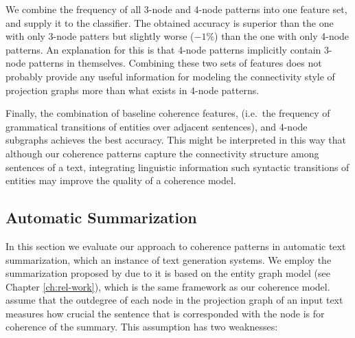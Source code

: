 We combine the frequency of all 3-node and 4-node patterns into one feature set, and supply it to the classifier.   
The obtained accuracy is superior than the one with only 3-node patters but slightly worse  ($-1\%$) than the one with only 4-node patterns. 
An explanation for this is that 4-node patterns implicitly contain 3-node patterns in themselves. 
Combining these two sets of features does not probably provide any useful information for modeling the connectivity style of projection graphs more than what exists in 4-node patterns. 

Finally, the combination of baseline coherence features, (i.e.\ the frequency of grammatical transitions of entities over adjacent sentences), and 4-node subgraphs achieves the best accuracy. 
This might be interpreted in this way that although our coherence patterns capture the connectivity structure among sentences of a text, integrating linguistic information such syntactic transitions of entities may improve the quality of a coherence model.  

\subsection{Automatic Summarization}

In this section we evaluate our approach to coherence patterns in automatic text summarization, which an instance of text generation systems. 
We employ the summarization proposed by  due to it is based on the entity graph model (see Chapter \ref{ch:rel-work}), which is the same framework as our coherence model. 
 assume that the outdegree of each node in the projection graph of an input text measures how crucial the sentence that is corresponded with the node is for coherence of the summary.  
This assumption has two weaknesses: 

